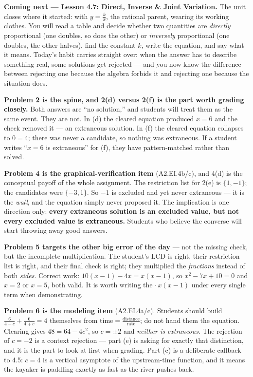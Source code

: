 \documentclass[10pt]{article}
\begin{document}
\begin{spiralbox}
\textbf{Coming next --- Lesson 4.7: Direct, Inverse \& Joint Variation.} The unit closes where it
started: with $y=\frac{k}{x}$, the rational parent, wearing its working clothes. You will read a table
and decide whether two quantities are \emph{directly} proportional (one doubles, so does the other) or
\emph{inversely} proportional (one doubles, the other halves), find the constant $k$, write the
equation, and say what it means. Today's habit carries straight over: when the answer has to describe
something real, some solutions get rejected --- and you now know the difference between rejecting one
because the algebra forbids it and rejecting one because the situation does.
\end{spiralbox}

\begin{teachernote}
\textbf{Problem 2 is the spine, and 2(d) versus 2(f) is the part worth grading closely.} Both answers
are ``no solution,'' and students will treat them as the same event. They are not. In (d) the cleared
equation produced $x=6$ and the check removed it --- an extraneous solution. In (f) the cleared
equation collapses to $0=4$; there was never a candidate, so nothing was extraneous. If a student
writes ``$x=6$ is extraneous'' for (f), they have pattern-matched rather than solved.

\vspace{3pt}
\textbf{Problem 4 is the graphical-verification item} (A2.EI.4b/c), and 4(d) is the conceptual payoff of
the whole assignment. The restriction list for 2(e) is $\{1,-1\}$; the candidates were $\{-3,1\}$. So
$-1$ is excluded and yet never extraneous --- it is the \emph{wall}, and the equation simply never
proposed it. The implication is one direction only: \textbf{every extraneous solution is an excluded
value, but not every excluded value is extraneous.} Students who believe the converse will start
throwing away good answers.

\vspace{3pt}
\textbf{Problem 5 targets the other big error of the day} --- not the missing check, but the incomplete
multiplication. The student's LCD is right, their restriction list is right, and their final check is
right; they multiplied the \emph{fractions} instead of both \emph{sides}. Correct work:
$10(x-1)-4x=x(x-1)$, so $x^2-7x+10=0$ and $x=2$ or $x=5$, both valid. It is worth writing the
$\cdot\,x(x-1)$ under every single term when demonstrating.

\vspace{3pt}
\textbf{Problem 6 is the modeling item} (A2.EI.4a/c). Students should build $\frac{6}{4-c}+\frac{6}{4+c}
=4$ themselves from $\text{time}=\frac{\text{distance}}{\text{rate}}$; do not hand them the equation.
Clearing gives $48=64-4c^2$, so $c=\pm2$ and \emph{neither is extraneous}. The rejection of $c=-2$ is a
context rejection --- part (e) is asking for exactly that distinction, and it is the part to look at
first when grading. Part (c) is a deliberate callback to 4.5: $c=4$ is a vertical asymptote of the
upstream-time function, and it means the kayaker is paddling exactly as fast as the river pushes back.


\end{teachernote}
\end{document}
